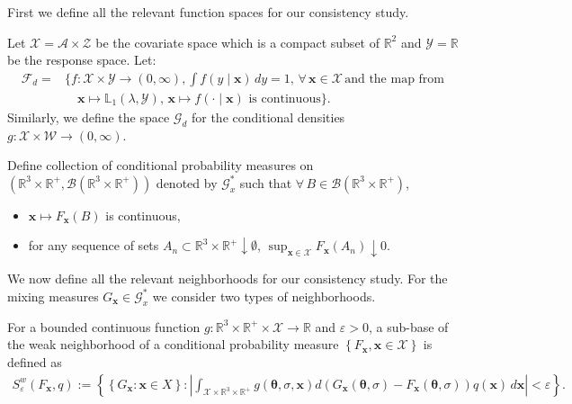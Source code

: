 First we define all the relevant function spaces for our consistency study.
\begin{definition}\label{def: F_d}
Let $\mathcal{X}= \mathcal{A} \times \mathcal{Z}$ be the covariate space which is a compact subset of $\mathbb{R}^2$ and $\mathcal{Y} = \mathbb{R}$ be the response space. Let:
\begin{align*}
    \mathcal{F}_d=&\bigg\{f: \mathcal{X} \times \mathcal{Y} \rightarrow (0, \infty), \int f(y \mid \boldsymbol{x}) \, d y = 1, \, \forall \, \boldsymbol{x} \in \mathcal{X} \, \text{and the map from} \, \\
    &\quad \boldsymbol{x} \mapsto \mathbb{L}_1(\lambda, \mathcal{Y}), \, \boldsymbol{x} \mapsto f(\cdot \mid \boldsymbol{x}) \, \,  \text{is continuous} \bigg\}.
\end{align*}
Similarly, we define the space $\mathcal{G}_d$ for the conditional densities $g : \mathcal{X} \times \mathcal{W} \rightarrow (0, \infty)$.
\end{definition}

\begin{definition}\label{def: set G*}
Define collection of conditional probability measures on $(\mathbb{R}^3 \times \mathbb{R}^+, \mathcal{B} (\mathbb{R}^3 \times \mathbb{R}^{+} ) )$ denoted by $\mathscr{G}_x^{*}$ such that $ \forall \, B \in \mathcal{B}(\mathbb{R}^3 \times \mathbb{R}^{+})$, 
\begin{itemize}
\item $\boldsymbol{x} \mapsto F_{\boldsymbol{x}}(B)$ is continuous,
\item  for any sequence of sets $A_n \subset \mathbb{R}^3 \times \mathbb{R}^+ \downarrow \emptyset$, $\sup_{\boldsymbol{x} \in \mathcal{X}} F_{\boldsymbol{x}}(A_n) \downarrow 0$.
\end{itemize}
\end{definition}

We now define all the relevant neighborhoods for our consistency study. For the mixing measures $G_{\boldsymbol{x}} \in \mathscr{G}_x^{*}$ we consider two types of neighborhoods. 

\begin{definition}
For a bounded continuous function $g: \mathbb{R}^3 \times \mathbb{R}^{+} \times \mathcal{X} \rightarrow \mathbb{R}$ and $\varepsilon>0$, a sub-base of the weak neighborhood of a conditional probability measure $\left\{F_{\boldsymbol{x}}, \boldsymbol{x} \in \mathcal{X}\right\}$ is defined as
\begin{align}\label{eq: weak neighborhoods}
    S^w_{\varepsilon}(F_{\boldsymbol{x}},q) := \left\{ \left\{G_{\boldsymbol{x}}: \boldsymbol{x} \in X\right\}: \left| \int_{\mathcal{X} \times \mathbb{R}^3 \times \mathbb{R}^+}   g(\boldsymbol{\theta}, \sigma, \boldsymbol{x}) d\left(G_{\boldsymbol{x}}(\boldsymbol{\theta}, \sigma)-F_{\boldsymbol{x}}(\boldsymbol{\theta}, \sigma)\right)  q(\boldsymbol{x}) \, d \boldsymbol{x} \right| <\varepsilon \right\}.
\end{align}
\end{definition}


